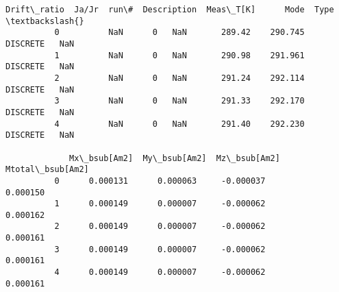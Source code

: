 \documentclass{article}
\begin{document}
\begin{Verbatim}[commandchars=\\\{\}]
             Drift\_ratio  Ja/Jr  run\#  Description  Meas\_T[K]      Mode  Type  \textbackslash{}
          0          NaN      0   NaN       289.42    290.745  DISCRETE   NaN   
          1          NaN      0   NaN       290.98    291.961  DISCRETE   NaN   
          2          NaN      0   NaN       291.24    292.114  DISCRETE   NaN   
          3          NaN      0   NaN       291.33    292.170  DISCRETE   NaN   
          4          NaN      0   NaN       291.40    292.230  DISCRETE   NaN   
          
             Mx\_bsub[Am2]  My\_bsub[Am2]  Mz\_bsub[Am2]  Mtotal\_bsub[Am2]  
          0      0.000131      0.000063     -0.000037          0.000150  
          1      0.000149      0.000007     -0.000062          0.000162  
          2      0.000149      0.000007     -0.000062          0.000161  
          3      0.000149      0.000007     -0.000062          0.000161  
          4      0.000149      0.000007     -0.000062          0.000161  
\end{Verbatim}
        
\end{document}
